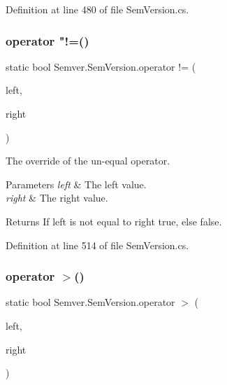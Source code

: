 Definition at line 480 of file Sem\+Version.\+cs.

\mbox{\label{class_semver_1_1_sem_version_ab0eb279a6d17558b7b134359f8179ff4}} 
\subsubsection{\texorpdfstring{operator "!=()}{operator !=()}}
{\footnotesize\ttfamily static bool Semver.\+Sem\+Version.\+operator != (\begin{DoxyParamCaption}\item[{\mbox{\hyperlink{class_semver_1_1_sem_version}{Sem\+Version}}}]{left,  }\item[{\mbox{\hyperlink{class_semver_1_1_sem_version}{Sem\+Version}}}]{right }\end{DoxyParamCaption})\hspace{0.3cm}{\ttfamily [static]}}



The override of the un-\/equal operator. 


\begin{DoxyParams}{Parameters}
{\em left} & The left value.\\
\hline
{\em right} & The right value.\\
\hline
\end{DoxyParams}
\begin{DoxyReturn}{Returns}
If left is not equal to right {\ttfamily true}, else {\ttfamily false}.
\end{DoxyReturn}


Definition at line 514 of file Sem\+Version.\+cs.

\mbox{\label{class_semver_1_1_sem_version_a7206817504d2de152c454cfda9e3bd71}} 
\subsubsection{\texorpdfstring{operator $>$()}{operator >()}}
{\footnotesize\ttfamily static bool Semver.\+Sem\+Version.\+operator $>$ (\begin{DoxyParamCaption}\item[{\mbox{\hyperlink{class_semver_1_1_sem_version}{Sem\+Version}}}]{left,  }\item[{\mbox{\hyperlink{class_semver_1_1_sem_version}{Sem\+Version}}}]{right }\end{DoxyParamCaption})\hspace{0.3cm}{\ttfamily [static]}}



